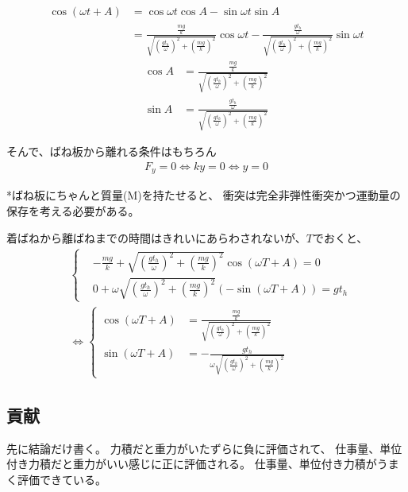 \documentclass[a4paper,11pt]{jsarticle}
\begin{document}
\begin{align}
  \cos\left( \omega t + A \right)
   & = \cos \omega t \cos A - \sin \omega t \sin A
  \\&= \frac{\frac{mg}{k}}{\sqrt{\left(\frac{gt_h}{\omega}\right)^2 + \left(\frac{mg}{k}\right)^2}}\cos\omega t
  - \frac{\frac{gt_h}{\omega}}{\sqrt{\left(\frac{gt_h}{\omega}\right)^2 + \left(\frac{mg}{k}\right)^2}}\sin \omega t
\end{align}
\begin{align}
  \cos A & = \frac{\frac{mg}{k}}{\sqrt{\left(\frac{gt_h}{\omega}\right)^2 + \left(\frac{mg}{k}\right)^2}}
  \\ \sin A &= \frac{\frac{gt_h}{\omega}}{\sqrt{\left(\frac{gt_h}{\omega}\right)^2 + \left(\frac{mg}{k}\right)^2}}
\end{align}

そんで、ばね板から離れる条件はもちろん
\begin{align}
  F_y = 0 \Leftrightarrow ky = 0 \Leftrightarrow y = 0
\end{align}

*ばね板にちゃんと質量(M)を持たせると、
衝突は完全非弾性衝突かつ運動量の保存を考える必要がある。

着ばねから離ばねまでの時間はきれいにあらわされないが、$T$でおくと、
\begin{align}
   & \begin{cases}
        & -\frac{mg}{k} + \sqrt{\left(\frac{gt_h}{\omega}\right)^2 + \left(\frac{mg}{k}\right)^2} \cos \left( \omega T + A \right) = 0
       \\& 0 + \omega \sqrt{\left(\frac{gt_h}{\omega}\right)^2 + \left(\frac{mg}{k}\right)^2} \left( - \sin \left( \omega T + A \right) \right) = gt_h
     \end{cases}
  \\& \Leftrightarrow
  \begin{cases}
    \cos \left( \omega T + A \right) & = \frac{ \frac{mg}{k} }{ \sqrt{\left(\frac{gt_h}{\omega}\right)^2 + \left(\frac{mg}{k}\right)^2} }
    \\ \sin \left( \omega T + A \right) &= - \frac{gt_h}{ \omega \sqrt{\left(\frac{gt_h}{\omega}\right)^2 + \left(\frac{mg}{k}\right)^2} }
  \end{cases}
\end{align}

\subsection{貢献}
先に結論だけ書く。
力積だと重力がいたずらに負に評価されて、
仕事量、単位付き力積だと重力がいい感じに正に評価される。
仕事量、単位付き力積がうまく評価できている。
\end{document}
